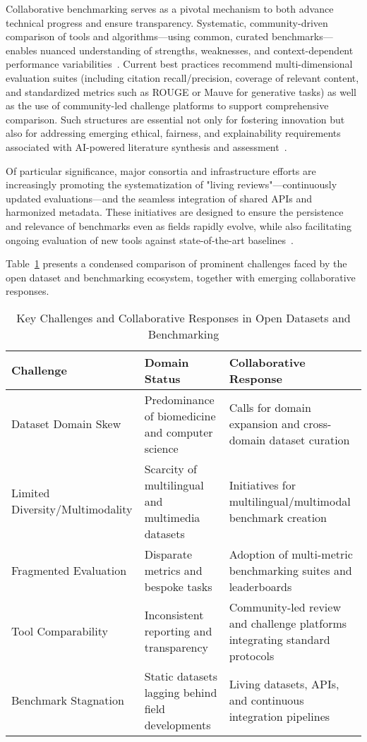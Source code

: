 \documentclass[11pt]{article}
\begin{document}
Collaborative benchmarking serves as a pivotal mechanism to both advance technical progress and ensure transparency. Systematic, community-driven comparison of tools and algorithms—using common, curated benchmarks—enables nuanced understanding of strengths, weaknesses, and context-dependent performance variabilities~\cite{ref31,ref32,ref33,ref78,ref80,ref102,ref104,ref106}. Current best practices recommend multi-dimensional evaluation suites (including citation recall/precision, coverage of relevant content, and standardized metrics such as ROUGE or Mauve for generative tasks) as well as the use of community-led challenge platforms to support comprehensive comparison. Such structures are essential not only for fostering innovation but also for addressing emerging ethical, fairness, and explainability requirements associated with AI-powered literature synthesis and assessment~\cite{ref32,ref104,ref106,ref80,ref98}.

Of particular significance, major consortia and infrastructure efforts are increasingly promoting the systematization of "living reviews"—continuously updated evaluations—and the seamless integration of shared APIs and harmonized metadata. These initiatives are designed to ensure the persistence and relevance of benchmarks even as fields rapidly evolve, while also facilitating ongoing evaluation of new tools against state-of-the-art baselines~\cite{ref35,ref68,ref78,ref106}.

Table~\ref{tab:open_dataset_benchmarking} presents a condensed comparison of prominent challenges faced by the open dataset and benchmarking ecosystem, together with emerging collaborative responses.

\begin{table}[ht]
\centering
\caption{Key Challenges and Collaborative Responses in Open Datasets and Benchmarking}
\label{tab:open_dataset_benchmarking}
\begin{tabular}{|p{}|p{}|p{}|}
\hline
\textbf{Challenge} & \textbf{Domain Status} & \textbf{Collaborative Response} \\
\hline
Dataset Domain Skew & Predominance of biomedicine and computer science & Calls for domain expansion and cross-domain dataset curation \\
\hline
Limited Diversity/Multimodality & Scarcity of multilingual and multimedia datasets & Initiatives for multilingual/multimodal benchmark creation \\
\hline
Fragmented Evaluation & Disparate metrics and bespoke tasks & Adoption of multi-metric benchmarking suites and leaderboards \\
\hline
Tool Comparability & Inconsistent reporting and transparency & Community-led review and challenge platforms integrating standard protocols \\
\hline
Benchmark Stagnation & Static datasets lagging behind field developments & Living datasets, APIs, and continuous integration pipelines \\
\hline
\end{tabular}
\end{table}
\end{document}
